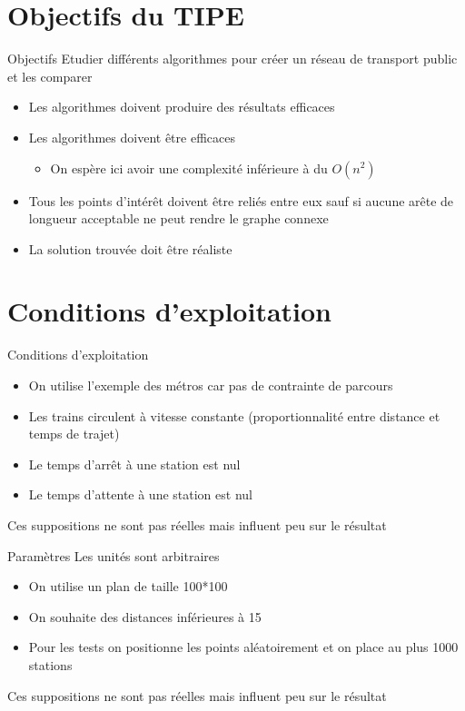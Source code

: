 \documentclass[aspectratio=43,11pt]{beamer}
\begin{document}
\section{Objectifs du TIPE}
\begin{frame}{Objectifs}
    Etudier différents algorithmes pour créer un réseau de transport public et les comparer
    \begin{itemize}
        \item Les algorithmes doivent produire des résultats efficaces
        \item Les algorithmes doivent être efficaces
        \begin{itemize}
            \item On espère ici avoir une complexité inférieure à du $O(n^2)$
        \end{itemize}
        \item Tous les points d'intérêt doivent être reliés entre eux sauf si aucune arête de longueur acceptable ne peut rendre le graphe connexe
        \item La solution trouvée doit être réaliste
    \end{itemize}
\end{frame}
\section{Conditions d'exploitation}
\begin{frame}{Conditions d'exploitation}
    \begin{itemize}
        \item On utilise l'exemple des métros car pas de contrainte de parcours
        \item Les trains circulent à vitesse constante (proportionnalité entre distance et temps de trajet)
        \item Le temps d'arrêt à une station est nul
        \item Le temps d'attente à une station est nul
    \end{itemize}
    Ces suppositions ne sont pas réelles mais influent peu sur le résultat
\end{frame}
\begin{frame}{Paramètres}
    Les unités sont arbitraires
    \begin{itemize}
        \item On utilise un plan de taille 100*100
        \item On souhaite des distances inférieures à 15
        \item Pour les tests on positionne les points aléatoirement et on place au plus 1000 stations
    \end{itemize}
    Ces suppositions ne sont pas réelles mais influent peu sur le résultat
\end{frame}
\end{document}
